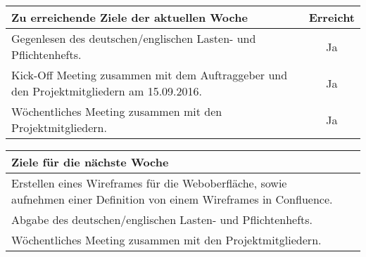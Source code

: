 \begin{tabularx}{\textwidth}{Xc}
    \arrayrulecolor{OliveGreen}
    \toprule
    {\bfseries Zu erreichende Ziele der aktuellen Woche} & {\bfseries Erreicht} \\
    \midrule[2pt]
    Gegenlesen des deutschen/englischen Lasten- und Pflichtenhefts.   &Ja     \\
    \rowcolor{OliveGreen!15}
    Kick-Off Meeting zusammen mit dem Auftraggeber und den Projektmitgliedern
    am 15.09.2016. &Ja     \\
    \rowcolor{White}
    Wöchentliches Meeting zusammen mit den Projektmitgliedern.        &Ja     \\
   \bottomrule[2pt]
\end{tabularx}
%
\vspace{1cm}
%
\begin{tabularx}{\textwidth}{Xc}
    \arrayrulecolor{OliveGreen}
    \toprule
    {\bfseries Ziele für die nächste Woche}                     &            \\
    \midrule[2pt]
    Erstellen eines Wireframes für die Weboberfläche, sowie aufnehmen einer
    Definition von einem Wireframes in Confluence.       &            \\
    \rowcolor{OliveGreen!15}
    Abgabe des deutschen/englischen  Lasten- und Pflichtenhefts. &            \\
    \rowcolor{White}
    Wöchentliches Meeting zusammen mit den Projektmitgliedern.   & \\
\end{tabularx}
